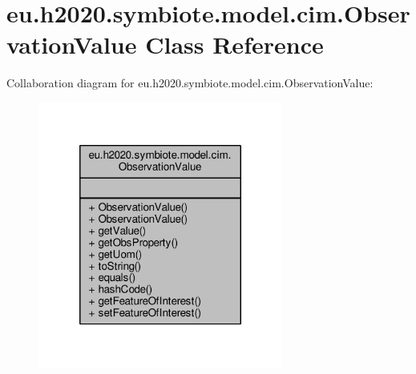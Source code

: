 \hypertarget{classeu_1_1h2020_1_1symbiote_1_1model_1_1cim_1_1ObservationValue}{}\section{eu.\+h2020.\+symbiote.\+model.\+cim.\+Observation\+Value Class Reference}
\label{classeu_1_1h2020_1_1symbiote_1_1model_1_1cim_1_1ObservationValue}


Collaboration diagram for eu.\+h2020.\+symbiote.\+model.\+cim.\+Observation\+Value\+:\nopagebreak
\begin{figure}[H]
\begin{center}
\leavevmode
\includegraphics[width=228pt]{classeu_1_1h2020_1_1symbiote_1_1model_1_1cim_1_1ObservationValue__coll__graph}
\end{center}
\end{figure}

